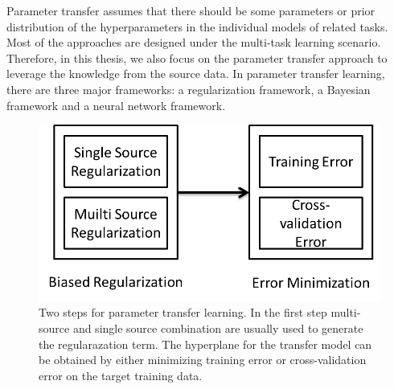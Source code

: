 Parameter transfer assumes that there should be some parameters or prior distribution of the hyperparameters in the individual models of related tasks. Most of the approaches are designed under the multi-task learning scenario. Therefore, in this thesis, we also focus on the parameter transfer approach to leverage the knowledge from the source data. In parameter transfer learning, there are three major frameworks: a regularization framework, a Bayesian framework and a neural network framework.
\begin{figure}
	\centering
	\includegraphics[scale =1]{relatedwork/fig/parameters.png}
	\caption{Two steps for parameter transfer learning. In the first step multi-source and single source combination are usually used to generate the regularazation term. The hyperplane for the transfer model can be obtained by either minimizing training error or cross-validation error on the target training data.}
\end{figure}

